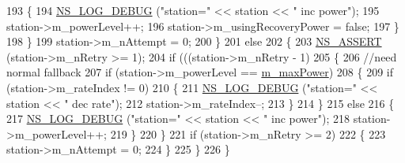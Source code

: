 \begin{DoxyCode}
193             \{
194               \hyperlink{group__logging_ga413f1886406d49f59a6a0a89b77b4d0a}{NS\_LOG\_DEBUG} (\textcolor{stringliteral}{"station="} << station << \textcolor{stringliteral}{" inc power"});
195               station->m\_powerLevel++;
196               station->m\_usingRecoveryPower = \textcolor{keyword}{false};
197             \}
198         \}
199       station->m\_nAttempt = 0;
200     \}
201   \textcolor{keywordflow}{else}
202     \{
203       \hyperlink{assert_8h_a6dccdb0de9b252f60088ce281c49d052}{NS\_ASSERT} (station->m\_nRetry >= 1);
204       \textcolor{keywordflow}{if} (((station->m\_nRetry - 1) %
205         \{
206           \textcolor{comment}{//need normal fallback}
207           \textcolor{keywordflow}{if} (station->m\_powerLevel == \hyperlink{classns3_1_1ParfWifiManager_a6894ea0155e04eab0db55007342d5a78}{m\_maxPower})
208             \{
209               \textcolor{keywordflow}{if} (station->m\_rateIndex != 0)
210                 \{
211                   \hyperlink{group__logging_ga413f1886406d49f59a6a0a89b77b4d0a}{NS\_LOG\_DEBUG} (\textcolor{stringliteral}{"station="} << station << \textcolor{stringliteral}{" dec rate"});
212                   station->m\_rateIndex--;
213                 \}
214             \}
215           \textcolor{keywordflow}{else}
216             \{
217               \hyperlink{group__logging_ga413f1886406d49f59a6a0a89b77b4d0a}{NS\_LOG\_DEBUG} (\textcolor{stringliteral}{"station="} << station << \textcolor{stringliteral}{" inc power"});
218               station->m\_powerLevel++;
219             \}
220         \}
221       \textcolor{keywordflow}{if} (station->m\_nRetry >= 2)
222         \{
223           station->m\_nAttempt = 0;
224         \}
225     \}
226 \}
\end{DoxyCode}
